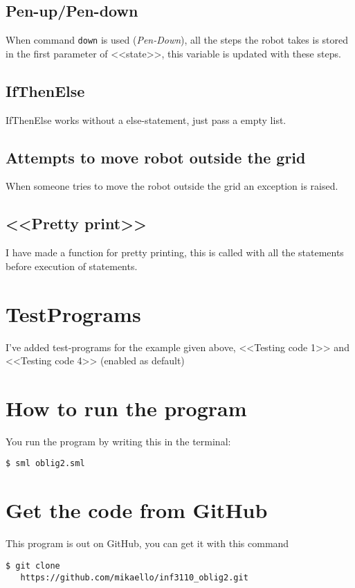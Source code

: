 \documentclass[11pt,english,a4paper]{article}
\begin{document}
\subsection{Pen-up/Pen-down}
When command \verb=down= is used (\emph{Pen-Down}), all the steps the
robot takes is stored in the first parameter of <<state>>, this
variable is updated with these steps.

\subsection{IfThenElse}
IfThenElse works without a else-statement, just pass a empty list.

\subsection{Attempts to move robot outside the grid}
When someone tries to move the robot outside the grid an exception is
raised.

\subsection{<<Pretty print>>}
I have made a function for pretty printing, this is called with all
the statements before execution of statements.

\section{TestPrograms}

I've added test-programs for the example given above, <<Testing code
1>> and <<Testing code 4>> (enabled as default)

\section{How to run the program }
You run the program by writing this in the terminal:
\begin{verbatim}
$ sml oblig2.sml
\end{verbatim}

\section{Get the code from GitHub}
This program is out on GitHub, you can get it with this command

\begin{verbatim}
$ git clone
   https://github.com/mikaello/inf3110_oblig2.git
\end{verbatim}
\end{document}
